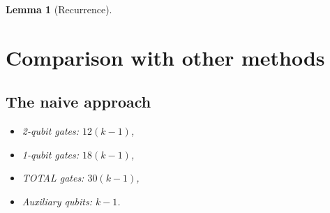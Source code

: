 \documentclass[12pt]{article}
\newcommand{\1}[1]{\mathds{1}\left[#1\right]}
\newtheorem{lemma}{Lemma}
\begin{document}
\begin{lemma}[Recurrence]
\section{Comparison with other methods}\label{sec:comparision}

\subsection{The naive approach}

\begin{itemize}
    \item 2-qubit gates: $12(k-1)$,
    \item 1-qubit gates: $18(k-1)$,
    \item TOTAL gates: $30(k-1)$,
    \item Auxiliary qubits: $k-1$.
\end{itemize}


\end{lemma}
\end{document}
